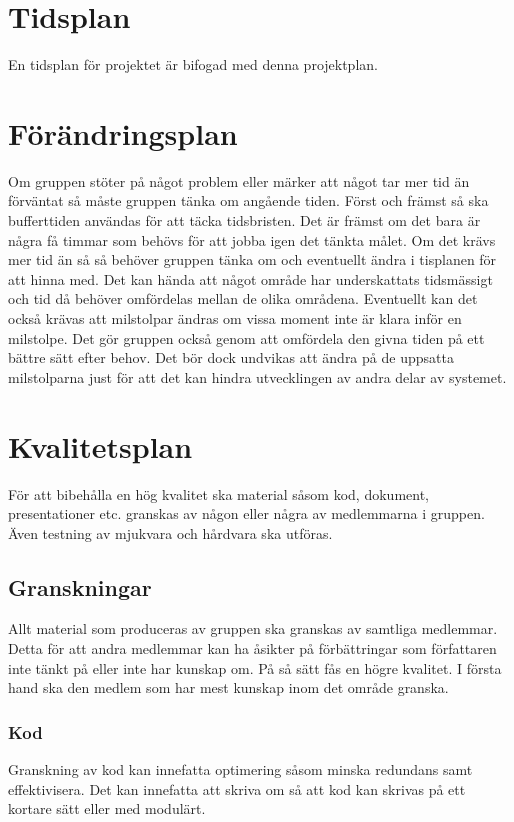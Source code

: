 \documentclass[projektplan/plan.tex]{subfiles}
\begin{document}
\section{Tidsplan}
En tidsplan för projektet är bifogad med denna projektplan.

\section{Förändringsplan}
Om gruppen stöter på något problem eller märker att något tar mer tid än
förväntat så måste gruppen tänka om angående tiden. Först och främst så ska
bufferttiden användas för att täcka tidsbristen. Det är främst om det bara är
några få timmar som behövs för att jobba igen det tänkta målet. Om det krävs
mer tid än så så behöver gruppen tänka om och eventuellt ändra i tisplanen för
att hinna med. Det kan hända att något område har underskattats tidsmässigt och
tid då behöver omfördelas mellan de olika områdena. Eventuellt kan det också
krävas att milstolpar ändras om vissa moment inte är klara inför en milstolpe.
Det gör gruppen också genom att omfördela den givna tiden på ett bättre sätt
efter behov. Det bör dock undvikas att ändra på de uppsatta milstolparna just
för att det kan hindra utvecklingen av andra delar av systemet.

\section{Kvalitetsplan}
För att bibehålla en hög kvalitet ska material såsom kod, dokument,
presentationer etc. granskas av någon eller några av medlemmarna i gruppen.
Även testning av mjukvara och hårdvara ska utföras.

\subsection{Granskningar}
Allt material som produceras av gruppen ska granskas av samtliga medlemmar.
Detta för att andra medlemmar kan ha åsikter på förbättringar som författaren
inte tänkt på eller inte har kunskap om. På så sätt fås en högre kvalitet. I
första hand ska den medlem som har mest kunskap inom det område granska.

\subsubsection{Kod}	
Granskning av kod kan innefatta optimering såsom minska redundans samt
effektivisera. Det kan innefatta att skriva om så att kod kan skrivas på ett
kortare sätt eller med modulärt.
\end{document}
